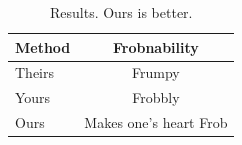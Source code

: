\documentclass[10pt,twocolumn,letterpaper]{article}
\begin{document}
\begin{table}
\begin{center}
\begin{tabular}{|l|c|}
\hline
Method & Frobnability \\
\hline\hline
Theirs & Frumpy \\
Yours & Frobbly \\
Ours & Makes one's heart Frob\\
\hline
\end{tabular}
\end{center}
\caption{Results.   Ours is better.}
\end{table}




{\small


}
\end{document}
